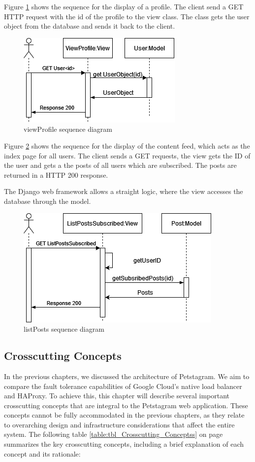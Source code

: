 \documentclass[lettersize,journal]{IEEEtran}
\begin{document}
Figure \ref{fig:viewProfile} shows the sequence for the display of a profile. The client send a GET HTTP request with the id of the profile to the view class. The class gets the user object from the database and sends it back to the client.

\begin{figure}[!t]
    \centering
    \includegraphics[width=3.5 in]{diagrams/viewProfile_sequence.drawio.png}
    \caption{viewProfile sequence diagram}
    \label{fig:viewProfile}
\end{figure}

Figure \ref{fig:listPosts} shows the sequence for the display of the content feed, which acts as the index page for all users. The client sends a GET requests, the view gets the ID of the user and gets a the posts of all users which are subscribed. The posts are returned in a HTTP 200 response.

The Django web framework allows a straight logic, where the view accesses the database through the model.
\begin{figure}[!t]
    \centering
    \includegraphics[width=3.5 in]{diagrams/ListPostsSubscribed_sequence.drawio.png}
    \caption{listPosts sequence diagram}
    \label{fig:listPosts}
\end{figure}

\subsection{Crosscutting Concepts}
\noindent
In the previous chapters, we discussed the architecture of Petstagram. We aim to compare the fault tolerance capabilities of Google Cloud's native load balancer and HAProxy. To achieve this, this chapter will describe several important crosscutting concepts that are integral to the Petstagram web application. These concepts cannot be fully accommodated in the previous chapters, as they relate to overarching design and infrastructure considerations that affect the entire system. The following table \ref{table:tbl_Crosscutting_Conceptss} on page \pageref{table:tbl_Crosscutting_Conceptss} summarizes the key crosscutting concepts, including a brief explanation of each concept and its rationale:
\end{document}
